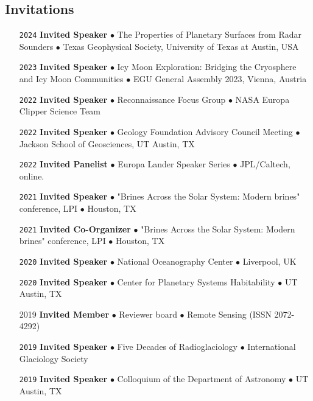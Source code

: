 \begin{itemize}[leftmargin=3.8em, labelsep=1.5em]
\end{itemize}

\vspace{-1.5em}
\subsection*{Invitations}

\begin{itemize}[leftmargin=3.8em, labelsep=1.5em]
    \setlength\itemsep{-.5em}
    \item[\texttt{2024}] \textbf{Invited Speaker} $\bullet$ The Properties of Planetary Surfaces from Radar Sounders $\bullet$ Texas Geophysical Society, University of Texas at Austin, USA
    \item[\texttt{2023}] \textbf{Invited Speaker} $\bullet$ Icy Moon Exploration: Bridging the Cryosphere and Icy Moon Communities $\bullet$  EGU General Assembly 2023, Vienna, Austria
    \item[\texttt{2022}] \textbf{Invited Speaker} $\bullet$ Reconnaissance Focus Group $\bullet$ NASA Europa Clipper Science Team
    \item[\texttt{2022}] \textbf{Invited Speaker} $\bullet$ Geology Foundation Advisory Council Meeting $\bullet$ Jackson School of Geosciences, UT Austin, TX
    \item[\texttt{2022}] \textbf{Invited Panelist} $\bullet$ Europa Lander Speaker Series $\bullet$ JPL/Caltech, online.
    \item[\texttt{2021}] \textbf{Invited Speaker} $\bullet$ "Brines Across the Solar System: Modern brines" conference, LPI $\bullet$ Houston, TX
    \item[\texttt{2021}] \textbf{Invited Co-Organizer} $\bullet$ "Brines Across the Solar System: Modern brines" conference, LPI $\bullet$ Houston, TX
    \item[\texttt{2020}] \textbf{Invited Speaker} $\bullet$ National Oceanography Center $\bullet$ Liverpool, UK
    \item[\texttt{2020}] \textbf{Invited Speaker} $\bullet$ Center for Planetary Systems Habitability $\bullet$ UT Austin, TX
    \item[2019] \textbf{Invited Member} $\bullet$ Reviewer board $\bullet$ Remote Sensing (ISSN 2072-4292)
    \item[\texttt{2019}] \textbf{Invited Speaker} $\bullet$ Five Decades of Radioglaciology $\bullet$ International Glaciology Society
    \item[\texttt{2019}] \textbf{Invited Speaker} $\bullet$ Colloquium of the Department of Astronomy $\bullet$ UT Austin, TX

\end{itemize}
